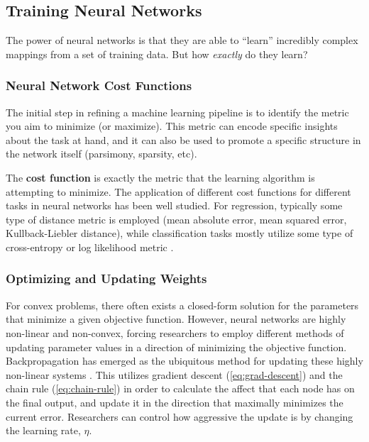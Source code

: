 \subsection{Training Neural Networks}

The power of neural networks is that they are able to ``learn'' incredibly complex mappings from a set of training data.
But how \emph{exactly} do they learn?

\subsubsection{Neural Network Cost Functions}

The initial step in refining a machine learning pipeline is to identify the metric you aim to minimize (or maximize).
This metric can encode specific insights about the task at hand, and it can also be used to promote a specific structure in the network itself (parsimony, sparsity, etc).

The \textbf{cost function} is exactly the metric that the learning algorithm is attempting to minimize.
The application of different cost functions for different tasks in neural networks has been well studied.
For regression, typically some type of distance metric is employed (mean absolute error, mean squared error, Kullback-Liebler distance), while classification tasks mostly utilize some type of cross-entropy or log likelihood metric \cite{paszkePyTorchImperativeStyle2019}.

\subsubsection{Optimizing and Updating Weights}

For convex problems, there often exists a closed-form solution for the parameters that minimize a given objective function.
However, neural networks are highly non-linear and non-convex, forcing researchers to employ different methods of updating parameter values in a direction of minimizing the objective function.
Backpropagation has emerged as the ubiquitous method for updating these highly non-linear systems \cite{rumelhartLearningRepresentationsBackpropagating1986}.
This utilizes gradient descent (\cref{eq:grad-descent}) and the chain rule (\cref{eq:chain-rule}) in order to calculate the affect that each node has on the final output, and update it in the direction that maximally minimizes the current error.
Researchers can control how aggressive the update is by changing the learning rate, $\eta$.

